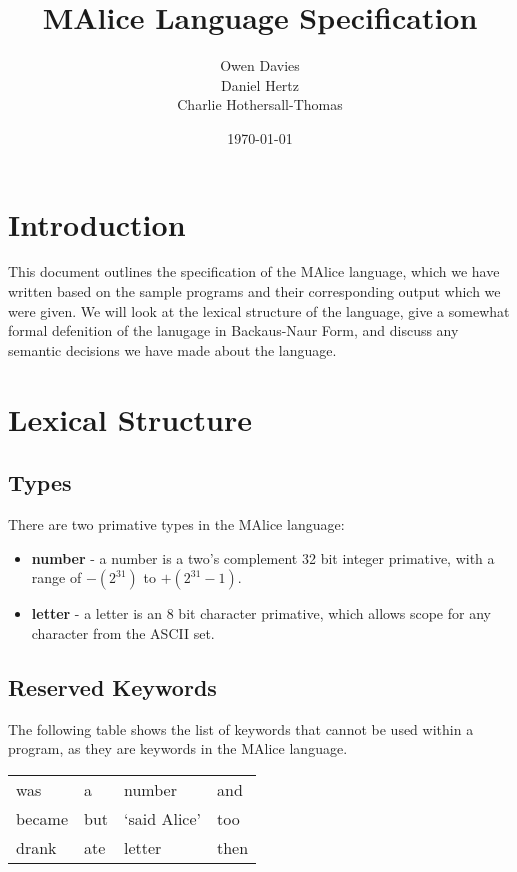 \documentclass[a4, 11pt]{article}
\begin{document}
\title{\huge{MAlice Language Specification}}
\author{Owen Davies\\Daniel Hertz\\Charlie Hothersall-Thomas}
\date{\today}

\maketitle

\section*{Introduction}
This document outlines the specification of the MAlice language, which we have 
written based on the sample programs and their corresponding output which we 
were given. We will look at the lexical structure of the language, give a 
somewhat formal defenition of the lanugage in Backaus-Naur Form, and discuss 
any semantic decisions we have made about the language.

\section*{Lexical Structure}
\subsection*{Types}
There are two primative types in the MAlice language:

\begin{itemize}
  \item \textbf{number} - a number is a two's complement 32 bit integer 
  primative, with a range of \( -(2^{31}) \) to \( +(2^{31} - 1) \). 
  \item \textbf{letter} - a letter is an 8 bit character primative, which 
  allows scope for any character from the ASCII set.
\end{itemize}

\subsection*{Reserved Keywords}
The following table shows the list of keywords that cannot be used within a 
program, as they are keywords in the MAlice language.

\begin{tabular}{l l l l}
was    & a   & number                                   & and\\
became & but & \textquoteleft said Alice\textquoteright & too\\
drank  & ate & letter                                   & then\\
\end{tabular}
\end{document}

